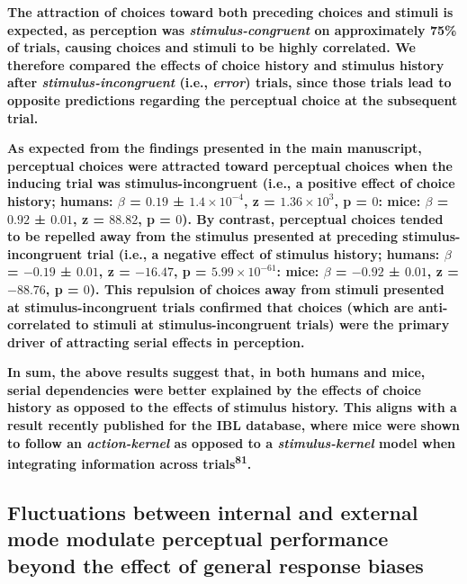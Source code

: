 \documentclass[
]{article}
\begin{document}
\textbf{The attraction of choices toward both preceding choices and
stimuli is expected, as perception was \emph{stimulus-congruent} on
approximately 75\% of trials, causing choices and stimuli to be highly
correlated. We therefore compared the effects of choice history and
stimulus history after \emph{stimulus-incongruent} (i.e., \emph{error})
trials, since those trials lead to opposite predictions regarding the
perceptual choice at the subsequent trial.}

\textbf{As expected from the findings presented in the main manuscript,
perceptual choices were attracted toward perceptual choices when the
inducing trial was stimulus-incongruent (i.e., a positive effect of
choice history; humans: \(\beta\) = \(0.19\) ±
\(\ensuremath{1.4\times 10^{-4}}\), z =
\(\ensuremath{1.36\times 10^{3}}\), p = \(0\): mice: \(\beta\) =
\(0.92\) ± \(0.01\), z = \(88.82\), p = \(0\)). By contrast, perceptual
choices tended to be repelled away from the stimulus presented at
preceding stimulus-incongruent trial (i.e., a negative effect of
stimulus history; humans: \(\beta\) = \(-0.19\) ± \(0.01\), z =
\(-16.47\), p = \(\ensuremath{5.99\times 10^{-61}}\): mice: \(\beta\) =
\(-0.92\) ± \(0.01\), z = \(-88.76\), p = \(0\)). This repulsion of
choices away from stimuli presented at stimulus-incongruent trials
confirmed that choices (which are anti-correlated to stimuli at
stimulus-incongruent trials) were the primary driver of attracting
serial effects in perception.}

\textbf{In sum, the above results suggest that, in both humans and mice,
serial dependencies were better explained by the effects of choice
history as opposed to the effects of stimulus history. This aligns with
a result recently published for the IBL database, where mice were shown
to follow an \emph{action-kernel} as opposed to a \emph{stimulus-kernel}
model when integrating information across trials\textsuperscript{81}.}

\hypertarget{fluctuations-between-internal-and-external-mode-modulate-perceptual-performance-beyond-the-effect-of-general-response-biases}{%
\subsection{Fluctuations between internal and external mode modulate
perceptual performance beyond the effect of general response
biases}\label{fluctuations-between-internal-and-external-mode-modulate-perceptual-performance-beyond-the-effect-of-general-response-biases}}
\end{document}
